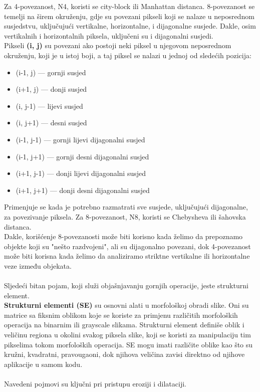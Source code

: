 \documentclass[a4paper,12pt]{article}
\begin{document}
Za 4-povezanost, N4, koristi se city-block ili Manhattan distanca.
8-povezanost se temelji na širem okruženju, gdje su povezani pikseli koji se nalaze u neposrednom susjedstvu, uključujući vertikalne, horizontalne, i dijagonalne susjede. Dakle, osim vertikalnih i horizontalnih piksela, uključeni su i dijagonalni susjedi.\\

Pikseli \textbf{ (i, j)} su povezani ako postoji neki piksel u njegovom neposrednom okruženju, koji je u istoj boji, a taj piksel se nalazi u jednoj od sledećih pozicija:
\begin{itemize}
\item (i-1, j) — gornji susjed
\item (i+1, j) — donji susjed
\item (i, j-1) — lijevi susjed
\item (i, j+1) — desni susjed

\item (i-1, j-1) — gornji lijevi dijagonalni susjed
\item (i-1, j+1) — gornji desni dijagonalni susjed
\item (i+1, j-1) — donji lijevi dijagonalni susjed
\item (i+1, j+1) — donji desni dijagonalni susjed

\end{itemize}

Primenjuje se kada je potrebno razmatrati sve susjede, uključujući dijagonalne, za povezivanje piksela.
 Za 8-povezanost, N8, koristi se Chebysheva ili šahovska distanca. \\
Dakle, korišćenje 8-povezanosti može biti korisno kada želimo da prepoznamo objekte koji su "nešto razdvojeni", ali su dijagonalno povezani, dok 4-povezanost može biti korisna kada želimo da analiziramo striktne vertikalne ili horizontalne veze između objekata.
\\ \\
Sljedeći bitan pojam, koji služi objašnjavanju gornjih operacije, jeste strukturni element.\\

 \textbf{Strukturni elementi (SE) }su osnovni alati u morfološkoj obradi slike.
Oni su matrice sa fiksnim oblikom koje se koriste za primjenu različitih morfoloških operacija na binarnim ili grayscale slikama. 
Strukturni element definiše oblik i veličinu regiona u okolini svakog piksela slike, koji se koristi za manipulaciju tim pikselima tokom morfoloških operacija. 
SE mogu imati različite oblike kao što su kružni, kvadratni, pravougaoni, dok njihova veličina zavisi direktno od njihove aplikacije u samom kodu. \\ \\
Navedeni pojmovi su ključni pri pristupu eroziji i dilataciji. \\
\end{document}

